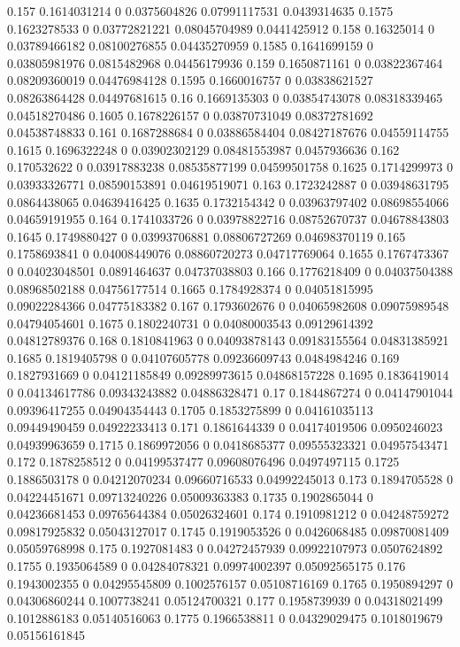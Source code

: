 {0.157 0.1614031214 0 0.0375604826 0.07991117531 0.0439314635
0.1575 0.1623278533 0 0.03772821221 0.08045704989 0.0441425912
0.158 0.16325014 0 0.03789466182 0.08100276855 0.04435270959
0.1585 0.1641699159 0 0.03805981976 0.0815482968 0.04456179936
0.159 0.1650871161 0 0.03822367464 0.08209360019 0.04476984128
0.1595 0.1660016757 0 0.03838621527 0.08263864428 0.04497681615
0.16 0.1669135303 0 0.03854743078 0.08318339465 0.04518270486
0.1605 0.1678226157 0 0.03870731049 0.08372781692 0.04538748833
0.161 0.1687288684 0 0.03886584404 0.08427187676 0.04559114755
0.1615 0.1696322248 0 0.03902302129 0.08481553987 0.0457936636
0.162 0.170532622 0 0.03917883238 0.08535877199 0.04599501758
0.1625 0.1714299973 0 0.03933326771 0.08590153891 0.04619519071
0.163 0.1723242887 0 0.03948631795 0.0864438065 0.04639416425
0.1635 0.1732154342 0 0.03963797402 0.08698554066 0.04659191955
0.164 0.1741033726 0 0.03978822716 0.08752670737 0.04678843803
0.1645 0.1749880427 0 0.03993706881 0.08806727269 0.04698370119
0.165 0.1758693841 0 0.04008449076 0.08860720273 0.04717769064
0.1655 0.1767473367 0 0.04023048501 0.0891464637 0.04737038803
0.166 0.1776218409 0 0.04037504388 0.08968502188 0.04756177514
0.1665 0.1784928374 0 0.04051815995 0.09022284366 0.04775183382
0.167 0.1793602676 0 0.04065982608 0.09075989548 0.04794054601
0.1675 0.1802240731 0 0.04080003543 0.09129614392 0.04812789376
0.168 0.1810841963 0 0.04093878143 0.09183155564 0.04831385921
0.1685 0.1819405798 0 0.04107605778 0.09236609743 0.0484984246
0.169 0.1827931669 0 0.04121185849 0.09289973615 0.04868157228
0.1695 0.1836419014 0 0.04134617786 0.09343243882 0.04886328471
0.17 0.1844867274 0 0.04147901044 0.09396417255 0.04904354443
0.1705 0.1853275899 0 0.04161035113 0.09449490459 0.04922233413
0.171 0.1861644339 0 0.04174019506 0.0950246023 0.04939963659
0.1715 0.1869972056 0 0.0418685377 0.09555323321 0.04957543471
0.172 0.1878258512 0 0.04199537477 0.09608076496 0.0497497115
0.1725 0.1886503178 0 0.04212070234 0.09660716533 0.04992245013
0.173 0.1894705528 0 0.04224451671 0.09713240226 0.05009363383
0.1735 0.1902865044 0 0.04236681453 0.09765644384 0.05026324601
0.174 0.1910981212 0 0.04248759272 0.09817925832 0.05043127017
0.1745 0.1919053526 0 0.0426068485 0.09870081409 0.05059768998
0.175 0.1927081483 0 0.04272457939 0.09922107973 0.0507624892
0.1755 0.1935064589 0 0.04284078321 0.09974002397 0.05092565175
0.176 0.1943002355 0 0.04295545809 0.1002576157 0.05108716169
0.1765 0.1950894297 0 0.04306860244 0.1007738241 0.05124700321
0.177 0.1958739939 0 0.04318021499 0.1012886183 0.05140516063
0.1775 0.1966538811 0 0.04329029475 0.1018019679 0.05156161845
}
